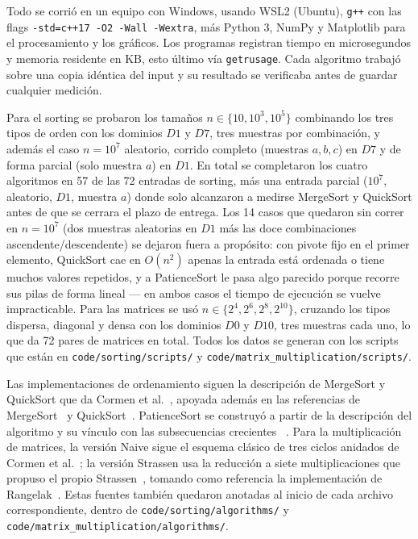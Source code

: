 Todo se corrió en un equipo con Windows, usando WSL2 (Ubuntu), \texttt{g++}
con las flags \texttt{-std=c++17 -O2 -Wall -Wextra}, más Python 3, NumPy y
Matplotlib para el procesamiento y los gráficos. Los programas registran
tiempo en microsegundos y memoria residente en KB, esto último vía
\texttt{getrusage}. Cada algoritmo trabajó sobre una copia idéntica del input
y su resultado se verificaba antes de guardar cualquier medición.

Para el sorting se probaron los tamaños $n\in\{10,10^3,10^5\}$ combinando los
tres tipos de orden con los dominios $D1$ y $D7$, tres muestras por
combinación, y además el caso $n=10^7$ aleatorio, corrido completo (muestras
$a,b,c$) en $D7$ y de forma parcial (solo muestra $a$) en $D1$. En total se
completaron los cuatro algoritmos en 57 de las 72 entradas de sorting, más
una entrada parcial ($10^7$, aleatorio, $D1$, muestra $a$) donde solo
alcanzaron a medirse MergeSort y QuickSort antes de que se cerrara el plazo
de entrega. Los 14 casos que quedaron sin correr en $n=10^7$ (dos muestras
aleatorias en $D1$ más las doce combinaciones ascendente/descendente) se
dejaron fuera a propósito: con pivote fijo en el primer elemento, QuickSort
cae en $O(n^2)$ apenas la entrada está ordenada o tiene muchos valores
repetidos, y a PatienceSort le pasa algo parecido porque recorre sus pilas de
forma lineal --- en ambos casos el tiempo de ejecución se vuelve
impracticable. Para las matrices se usó $n\in\{2^4,2^6,2^8,2^{10}\}$,
cruzando los tipos dispersa, diagonal y densa con los dominios $D0$ y $D10$,
tres muestras cada uno, lo que da 72 pares de matrices en total. Todos los
datos se generan con los scripts que están en \texttt{code/sorting/scripts/}
y \texttt{code/matrix\_multiplication/scripts/}.

Las implementaciones de ordenamiento siguen la descripción de MergeSort y
QuickSort que da Cormen et al.~\cite{cormen2009}, apoyada además en las
referencias de MergeSort~\cite{wikipedia_mergesort} y
QuickSort~\cite{wikipedia_quicksort}. PatienceSort se construyó a partir de
la descripción del algoritmo y su vínculo con las subsecuencias crecientes
~\cite{aldous1999patience,wikipedia_patience_sorting}. Para la multiplicación
de matrices, la versión Naive sigue el esquema clásico de tres ciclos
anidados de Cormen et al.~\cite{cormen2009}; la versión Strassen usa la
reducción a siete multiplicaciones que propuso el propio
Strassen~\cite{strassen1969}, tomando como referencia la implementación de
Rangelak~\cite{rangelak_strassen}. Estas fuentes también quedaron anotadas al
inicio de cada archivo correspondiente, dentro de
\texttt{code/sorting/algorithms/} y
\texttt{code/matrix\_multiplication/algorithms/}.
